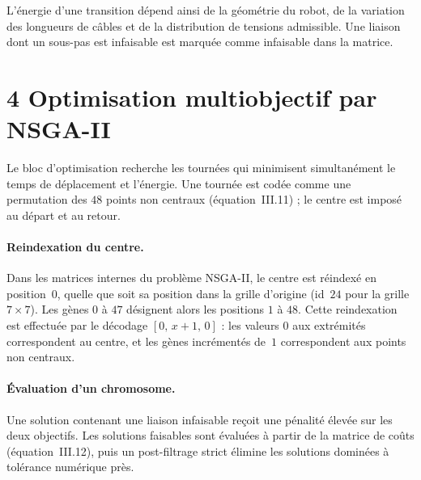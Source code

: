 L'énergie d'une transition dépend ainsi de la géométrie du robot, de la variation des longueurs de câbles et de la distribution de tensions admissible. Une liaison dont un sous-pas est infaisable est marquée comme infaisable dans la matrice.

\section*{4 Optimisation multiobjectif par NSGA-II}
\vspace{-0.3em}
Le bloc d'optimisation recherche les tournées qui minimisent simultanément le temps de déplacement et l'énergie. Une tournée est codée comme une permutation des $48$ points non centraux (équation~III.11) ; le centre est imposé au départ et au retour.

\paragraph{Reindexation du centre.}
Dans les matrices internes du problème NSGA-II, le centre est réindexé en position~$0$, quelle que soit sa position dans la grille d'origine (id~$24$ pour la grille $7\times7$). Les gènes $0$ à $47$ désignent alors les positions $1$ à $48$. Cette reindexation est effectuée par le décodage $[0,\, x{+}1,\, 0]$ : les valeurs $0$ aux extrémités correspondent au centre, et les gènes incrémentés de~$1$ correspondent aux points non centraux.

\paragraph{Évaluation d'un chromosome.}
Une solution contenant une liaison infaisable reçoit une pénalité élevée sur les deux objectifs. Les solutions faisables sont évaluées à partir de la matrice de coûts (équation~III.12), puis un post-filtrage strict élimine les solutions dominées à tolérance numérique près.

